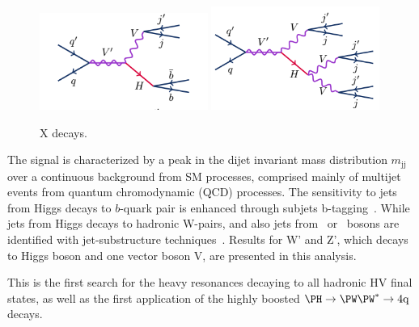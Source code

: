 \begin{figure}[ht!b]
\begin{center}
\includegraphics[width=0.49\textwidth]{EXO-14-009/figs/diagrambb.png}
\includegraphics[width=0.49\textwidth]{EXO-14-009/figs/diagramww.png}
\end{center}
\caption{
X decays. 
}
\label{fig:Xdecays}
\end{figure}




The signal is characterized by a peak in the dijet invariant mass
distribution $m_\mathrm{jj}$ over a continuous background from SM
processes, comprised mainly of multijet events from quantum
chromodynamic (QCD) processes. The sensitivity to jets from Higgs decays to
$b$-quark pair is enhanced through subjets b-tagging~\cite{BTV-13-001}.
While jets from Higgs decays to hadronic W-pairs, and also jets from \PW\ or
\cPZ\ bosons are identified with jet-substructure
techniques~\cite{topwtag_pas,JME-13-006}.
Results for W' and Z', which decays to Higgs boson and one vector boson V, are
presented in this analysis.

This is the first search for the heavy resonances decaying to all 
hadronic HV final
states, as well as the first application of the highly boosted
$\Hww$ decays.



